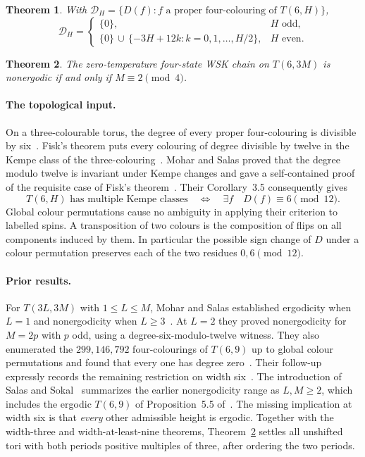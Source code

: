 \documentclass[11pt,a4paper]{article}
\newtheorem{theorem}{Theorem}
\newcommand{\specD}{\mathcal D}
\newcommand{\modulo}[1]{\pmod{#1}}
\begin{document}
\begin{theorem}\label{thm:spectrum}
With $\specD_H=\{D(f): f\text{ a proper four-colouring of }T(6,H)\}$,
\[
\specD_H=
\begin{cases}
\{0\}, &H\text{ odd},\\[2pt]
\{0\}\,\cup\,\{-3H+12k: k=0,1,\ldots,H/2\}, & H\text{ even}.
\end{cases}
\]
\end{theorem}

\begin{theorem}\label{thm:dynamics}
The zero-temperature four-state WSK chain on $T(6,3M)$ is nonergodic if and only if $M\equiv2\pmod4$.
\end{theorem}

\paragraph{The topological input.}
On a three-colourable torus, the degree of every proper four-colouring is divisible by six~\cite[Prop.~3.2]{ms}. Fisk's theorem puts every colouring of degree divisible by twelve in the Kempe class of the three-colouring~\cite{fisk,ms}. Mohar and Salas proved that the degree modulo twelve is invariant under Kempe changes and gave a self-contained proof of the requisite case of Fisk's theorem~\cite[Thm.~3.4 and Sec.~3.3]{ms}. Their Corollary~3.5 consequently gives
\begin{equation}\label{eq:bridge}
 T(6,H)\text{ has multiple Kempe classes}
 \quad\Longleftrightarrow\quad
 \exists f\quad D(f)\equiv6\modulo{12}.
\end{equation}
Global colour permutations cause no ambiguity in applying their criterion to labelled spins. A transposition of two colours is the composition of flips on all components induced by them. In particular the possible sign change of $D$ under a colour permutation preserves each of the two residues $0,6\pmod{12}$.

\paragraph{Prior results.}
For $T(3L,3M)$ with $1\le L\le M$, Mohar and Salas established ergodicity when $L=1$ and nonergodicity when $L\ge3$~\cite[Thms.~4.5, 5.4 and Prop.~5.2]{ms}. At $L=2$ they proved nonergodicity for $M=2p$ with $p$ odd, using a degree-six-modulo-twelve witness. They also enumerated the $299{,}146{,}792$ four-colourings of $T(6,9)$ up to global colour permutations and found that every one has degree zero~\cite[Prop.~5.5]{ms}. Their follow-up expressly records the remaining restriction on width six~\cite[following Thm.~2.12]{ms2}. The introduction of Salas and Sokal~\cite{salsok} summarizes the earlier nonergodicity range as $L,M\ge2$, which includes the ergodic $T(6,9)$ of Proposition~5.5 of~\cite{ms}. The missing implication at width six is that \emph{every} other admissible height is ergodic. Together with the width-three and width-at-least-nine theorems, Theorem~\ref{thm:dynamics} settles all unshifted tori with both periods positive multiples of three, after ordering the two periods.
\end{document}
